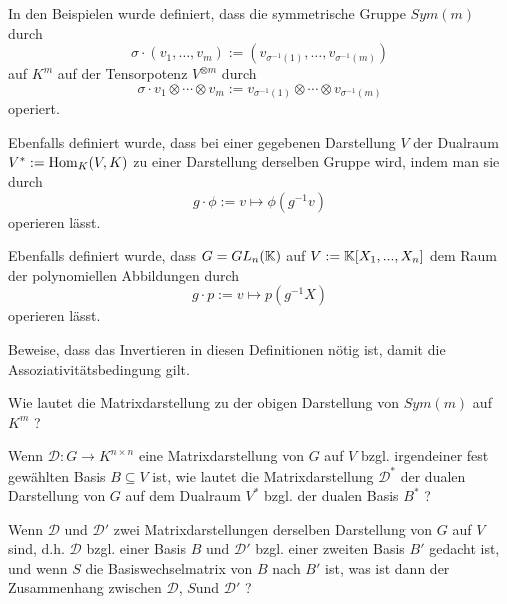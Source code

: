 \begin{sheet}

\begin{problem}[title={Komische Minus Einsen: Invertieren für die Assoziativitätsbedingung}, difficulty=leicht]\label{ex:invertieren_fuer_linksmoduln}
\begin{subproblem}
In den Beispielen wurde definiert, dass die symmetrische Gruppe $Sym(m)$ durch
\[\sigma \cdot (v_1,\ldots,v_m) := (v_{\sigma^{-1}(1)}, \ldots, v_{\sigma^{-1}(m)})\]
auf $K^m$ auf der Tensorpotenz $V^{\otimes m}$ durch
\[\sigma \cdot v_1\otimes\cdots\otimes v_m := v_{\sigma^{-1}(1)}\otimes \cdots \otimes v_{\sigma^{-1}(m)} \]
operiert.
\end{subproblem}
\begin{subproblem}
Ebenfalls definiert wurde, dass bei einer gegebenen Darstellung $V$ der Dualraum $V^\ast := \operatorname{Hom}_K(V,K)$ zu einer Darstellung derselben Gruppe wird, indem man sie durch
\[g\cdot \phi := v\mapsto \phi(g^{-1}v)\]
operieren lässt.
\end{subproblem}
\begin{subproblem}
Ebenfalls definiert wurde, dass $G=GL_n(\mathbb{K})$ auf $V:=\mathbb{K}[X_1, ..., X_n]$ dem Raum der polynomiellen Abbildungen durch
\[g\cdot p := v\mapsto p(g^{-1}X)\]
operieren lässt.
\end{subproblem}

Beweise, dass das Invertieren in diesen Definitionen nötig ist, damit die Assoziativitätsbedingung gilt.
\end{problem}

\begin{problem}[title={Darstellung der symmetrischen Gruppe mit Matrizen}]
Wie lautet die Matrixdarstellung zu der obigen Darstellung von $Sym(m)$ auf $K^m$ ?
\end{problem}

\begin{problem}[title={Dualisiere eine Matrixdarstellung}]
Wenn $\mathcal{D}: G\to K^{n\times n}$ eine Matrixdarstellung von $G$ auf $V$ bzgl. irgendeiner fest gewählten Basis $B\subseteq V$ ist, wie lautet die Matrixdarstellung $\mathcal{D}^\ast$ der dualen Darstellung von $G$ auf dem Dualraum $V^\ast$ bzgl. der dualen Basis $B^\ast$ ?
\end{problem}

\begin{problem}[title={Basiswechsel einer Darstellung}]
Wenn $\mathcal{D}$ und $\mathcal{D}'$ zwei Matrixdarstellungen derselben Darstellung von $G$ auf $V$ sind, d.h. $\mathcal{D}$ bzgl. einer Basis $B$ und $\mathcal{D}'$ bzgl. einer zweiten Basis $B'$ gedacht ist, und wenn $S$ die Basiswechselmatrix von $B$ nach $B'$ ist, was ist dann der Zusammenhang zwischen $\mathcal{D}$, $S$und $\mathcal{D}'$ ?
\end{problem}


\end{sheet}
